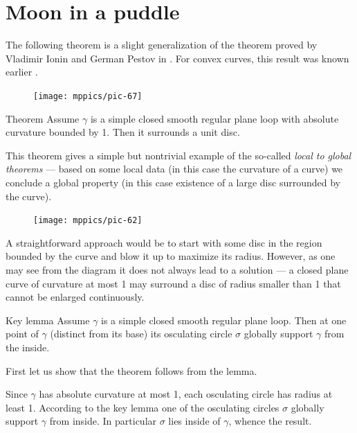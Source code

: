 \section*{Moon in a puddle}

The following theorem is a slight generalization of the theorem proved by Vladimir Ionin and German Pestov in \cite{pestov-ionin}.
For convex curves, this result was known earlier \cite[\S 24]{blaschke}.


\begin{figure}
\vskip-0mm
\centering
\texttt{[image: mppics/pic-67]}
\vskip0mm
\end{figure}

\begin{thm}{Theorem}\label{thm:moon-orginal}
Assume $\gamma$ is a simple closed smooth regular plane loop with absolute curvature bounded by 1.
Then it surrounds a unit disc.
\end{thm}

This theorem gives a simple but nontrivial example of the so-called \emph{local to global theorems} --- based on some local data (in this case the curvature of a curve) we conclude a global property (in this case existence of a large disc surrounded by the curve).

\begin{figure}
\vskip-0mm
\centering
\texttt{[image: mppics/pic-62]}
\vskip0mm
\end{figure}

A straightforward approach would be to start with some disc in the region bounded by the curve and blow it up to maximize its radius.
However, as one may see from the diagram it does not always lead to a solution --- a closed plane curve of curvature at most 1 may surround a disc of radius smaller than 1 that cannot be enlarged continuously.


\begin{thm}{Key lemma}\label{thm:moon}
Assume $\gamma$ is a simple closed smooth regular plane loop.
Then at one point of $\gamma$ (distinct from its base) its osculating circle $\sigma$ globally support $\gamma$ from the inside.
\end{thm}

First let us show that the theorem follows from the lemma.

Since $\gamma$ has absolute curvature at most 1, each osculating circle has radius at least 1.
According to the key lemma one of the osculating circles $\sigma$ globally support $\gamma$ from inside.
In particular $\sigma$ lies inside of $\gamma$, whence the result.
\qeds

